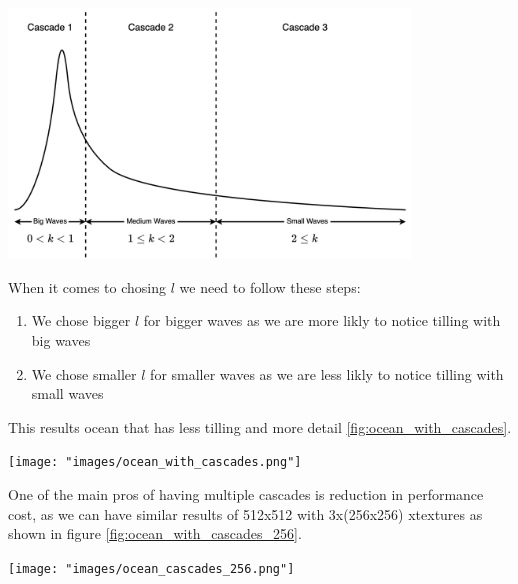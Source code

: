 \begin{minipage}{1\textwidth}
    \centering
    \includegraphics[width=0.8\textwidth]{"images/cascades.png"}
    \label{fig:cascades}
\end{minipage}
When it comes to chosing $l$ we need to follow these steps:
\begin{enumerate}
    \item We chose bigger $l$ for bigger waves as we are more likly to notice tilling with big waves
    \item We chose smaller $l$ for smaller waves as we are less likly to notice tilling with small waves
\end{enumerate}
This results ocean that has less tilling and more detail \ref{fig:ocean_with_cascades}.
\begin{minipage}{1\textwidth}
    \centering
    \texttt{[image: "images/ocean\_with\_cascades.png"]}
    \label{fig:ocean_with_cascades}
\end{minipage}

One of the main pros of having multiple cascades is reduction in performance cost, as we can have similar results of 512x512 with 3x(256x256) xtextures as shown in figure \ref{fig:ocean_with_cascades_256}.

\begin{minipage}{1\textwidth}
    \centering
    \texttt{[image: "images/ocean\_cascades\_256.png"]}
    \label{fig:ocean_with_cascades_256}
\end{minipage}


